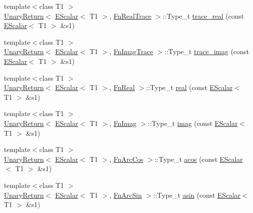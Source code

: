 \begin{DoxyCompactItemize}
{\footnotesize template$<$class T1 $>$ }\\\mbox{\hyperlink{structENSEM_1_1UnaryReturn}{Unary\+Return}}$<$ \mbox{\hyperlink{classENSEM_1_1EScalar}{E\+Scalar}}$<$ T1 $>$, \mbox{\hyperlink{structENSEM_1_1FnRealTrace}{Fn\+Real\+Trace}} $>$\+::Type\+\_\+t \mbox{\hyperlink{group__escalar_gac6853fb7b9f9b61b97cda696c804ab0a}{trace\+\_\+real}} (const \mbox{\hyperlink{classENSEM_1_1EScalar}{E\+Scalar}}$<$ T1 $>$ \&s1)
\item 
{\footnotesize template$<$class T1 $>$ }\\\mbox{\hyperlink{structENSEM_1_1UnaryReturn}{Unary\+Return}}$<$ \mbox{\hyperlink{classENSEM_1_1EScalar}{E\+Scalar}}$<$ T1 $>$, \mbox{\hyperlink{structENSEM_1_1FnImagTrace}{Fn\+Imag\+Trace}} $>$\+::Type\+\_\+t \mbox{\hyperlink{group__escalar_gad2c4bd25b83ec8aa100ff58b6b773d8c}{trace\+\_\+imag}} (const \mbox{\hyperlink{classENSEM_1_1EScalar}{E\+Scalar}}$<$ T1 $>$ \&s1)
\item 
{\footnotesize template$<$class T1 $>$ }\\\mbox{\hyperlink{structENSEM_1_1UnaryReturn}{Unary\+Return}}$<$ \mbox{\hyperlink{classENSEM_1_1EScalar}{E\+Scalar}}$<$ T1 $>$, \mbox{\hyperlink{structENSEM_1_1FnReal}{Fn\+Real}} $>$\+::Type\+\_\+t \mbox{\hyperlink{group__escalar_gae1f319d978abc1631bd68382787544aa}{real}} (const \mbox{\hyperlink{classENSEM_1_1EScalar}{E\+Scalar}}$<$ T1 $>$ \&s1)
\item 
{\footnotesize template$<$class T1 $>$ }\\\mbox{\hyperlink{structENSEM_1_1UnaryReturn}{Unary\+Return}}$<$ \mbox{\hyperlink{classENSEM_1_1EScalar}{E\+Scalar}}$<$ T1 $>$, \mbox{\hyperlink{structENSEM_1_1FnImag}{Fn\+Imag}} $>$\+::Type\+\_\+t \mbox{\hyperlink{group__escalar_ga415448f22c6dabfd82cbb0154e054c2e}{imag}} (const \mbox{\hyperlink{classENSEM_1_1EScalar}{E\+Scalar}}$<$ T1 $>$ \&s1)
\item 
{\footnotesize template$<$class T1 $>$ }\\\mbox{\hyperlink{structENSEM_1_1UnaryReturn}{Unary\+Return}}$<$ \mbox{\hyperlink{classENSEM_1_1EScalar}{E\+Scalar}}$<$ T1 $>$, \mbox{\hyperlink{structENSEM_1_1FnArcCos}{Fn\+Arc\+Cos}} $>$\+::Type\+\_\+t \mbox{\hyperlink{group__escalar_gac8e90d16773622bd9971db55f0c125c9}{acos}} (const \mbox{\hyperlink{classENSEM_1_1EScalar}{E\+Scalar}}$<$ T1 $>$ \&s1)
\item 
{\footnotesize template$<$class T1 $>$ }\\\mbox{\hyperlink{structENSEM_1_1UnaryReturn}{Unary\+Return}}$<$ \mbox{\hyperlink{classENSEM_1_1EScalar}{E\+Scalar}}$<$ T1 $>$, \mbox{\hyperlink{structENSEM_1_1FnArcSin}{Fn\+Arc\+Sin}} $>$\+::Type\+\_\+t \mbox{\hyperlink{group__escalar_gab463bdb3f1fadf6b5a87076e5d3dc9b9}{asin}} (const \mbox{\hyperlink{classENSEM_1_1EScalar}{E\+Scalar}}$<$ T1 $>$ \&s1)

\end{DoxyCompactItemize}
